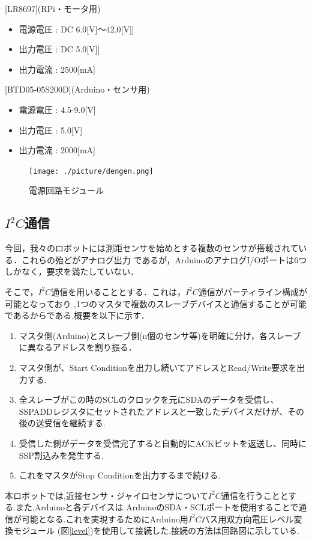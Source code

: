\documentclass[10pt,a4j]{ujarticle}
\begin{document}
[LR8697](RPi・モータ用)
\begin{itemize}
 \item 電源電圧 : DC 6.0[V]$〜$42.0[V]]
 \item 出力電圧 : DC 5.0[V]]
 \item 出力電流 : 2500[mA]
\end{itemize}

[BTD05-05S200D](Arduino・センサ用)
\begin{itemize}
 \item 電源電圧 : 4.5-9.0[V]
 \item 出力電圧 : 5.0[V]
 \item 出力電流 : 2000[mA]
\end{itemize}
\begin{figure}[t]
 \centering
 \texttt{[image: ./picture/dengen.png]}
    \caption{電源回路モジュール}
    \label{dengen}
\end{figure}
\newpage
\subsection{$I^2 C$通信}
今回，我々のロボットには測距センサを始めとする複数のセンサが搭載されている．これらの殆どがアナログ出力
であるが，ArduinoのアナログI/Oポートは6つしかなく，要求を満たしていない．

そこで，$I^2 C$通信を用いることとする．これは，$I^2 C$通信がパーティライン構成が可能となっており
,1つのマスタで複数のスレーブデバイスと通信することが可能であるからである.概要を以下に示す．
\begin{enumerate}
 \item マスタ側(Arduino)とスレーブ側(n個のセンサ等)を明確に分け，各スレーブに異なるアドレスを割り振る．
 \item マスタ側が、Start Conditionを出力し続いてアドレスとRead/Write要求を出力する.
 \item 全スレーブがこの時のSCLのクロックを元にSDAのデータを受信し、SSPADDレジスタにセットされたアドレスと一致したデバイスだけが、その後の送受信を継続する.
 \item 受信した側がデータを受信完了すると自動的にACKビットを返送し、同時にSSP割込みを発生する.
 \item これをマスタがStop Conditionを出力するまで続ける.
\end{enumerate}

本ロボットでは,近接センサ・ジャイロセンサについて$I^2 C$通信を行うこととする.また,Arduinoと各デバイスは
ArduinoのSDA・SCLポートを使用することで通信が可能となる.これを実現するためにArduino用$I^2 C$バス用双方向電圧レベル変換モジュール
(図\ref{level})を使用して接続した.接続の方法は回路図に示している.
\end{document}
